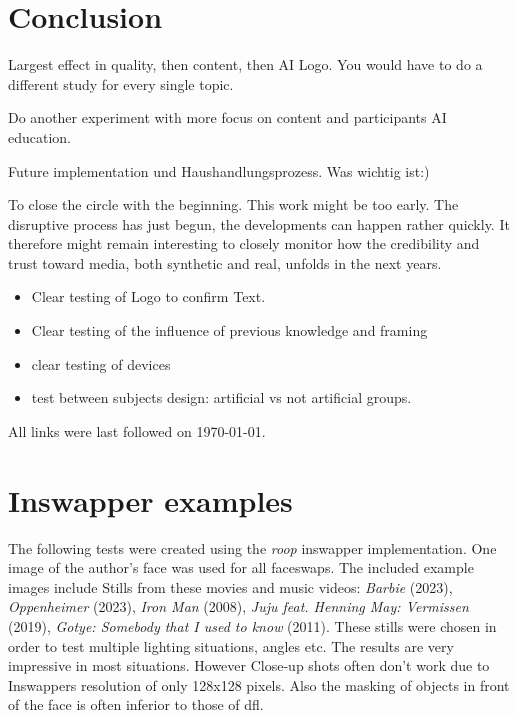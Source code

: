 \documentclass[
  a4paper,  %
  twoside,  %
  bibliography=totoc,
  headsepline,
  cleardoublepage=empty,
  parskip=half,
  draft=false
]{scrbook}
\begin{document}
\chapter{Conclusion}
\label{sec:conclusion}

Largest effect in quality, then content, then AI Logo.
You would have to do a different study for every single topic. 


Do another experiment with more focus on content and participants AI education. 

Future implementation und Haushandlungsprozess. Was wichtig ist:) 

To close the circle with the beginning. This work might be too early. The disruptive process has just begun, the developments can happen rather quickly. It therefore might remain interesting to closely monitor how the credibility and trust toward media, both synthetic and real, unfolds in the next years. 

\begin{itemize}
  \item Clear testing of Logo to confirm Text.
  \item Clear testing of the influence of previous knowledge and framing
  \item clear testing of devices
  \item test between subjects design: artificial vs not artificial groups. 
\end{itemize}






\printbibliography
All links were last followed on \today{}.

\appendix
\chapter{Inswapper examples}
\label{chap:insightface-demos}
The following tests were created using the \textit{roop} inswapper implementation. One image of the author's face was used for all faceswaps. The included example images include Stills from these movies and music videos: \textit{Barbie} (2023), \textit{Oppenheimer} (2023), \textit{Iron Man} (2008), \textit{Juju feat. Henning May: Vermissen} (2019), \textit{Gotye: Somebody that I used to know} (2011).
These stills were chosen in order to test multiple lighting situations, angles etc. The results are very impressive in most situations. However Close-up shots often don't work due to Inswappers resolution of only 128x128 pixels. Also the masking of objects in front of the face is often inferior to those of \gls{dfl}.
\end{document}
